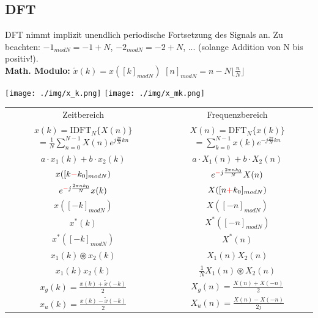 \documentclass[10pt,a4paper]{article}
\begin{document}
\begin{minipage}{0.5\textwidth}  
\subsection{DFT}
DFT nimmt implizit unendlich periodische Fortsetzung des Signals an. Zu beachten: $-1_{modN}=-1 + N$, $-2_{modN}=-2+N$, ... (solange Addition von N bis positiv!).\\
\textbf{Math. Modulo:}
$\tilde{x}(k) = x([k]_{modN})$ 
$[n]_{modN}=n-N \lfloor \frac{n}{N} \rfloor$
  \begin{center}
      \texttt{[image: ./img/x\_k.png]}
      \texttt{[image: ./img/x\_mk.png]}
  \end{center}

\begin{center}
  \bgroup
  \def\arraystretch{1.5}
  \begin{tabular}{ | c | c | }
  \cline{1-2}
          \rowcolor{black!15}
          Zeitbereich & Frequenzbereich \\
  
  \cline{1-2}
          \shortstack{$x(k)=\text{IDFT}_N\{X(n)\}$ \\ $=\frac{1}{N}\displaystyle\sum\limits_{n=0}^{N-1}X(n)e^{j\frac{2\pi}{N}kn}$} &
          \shortstack{$X(n)=\text{DFT}_N\{x(k)\}$ \\ $=\displaystyle\sum\limits_{k=0}^{N-1}x(k)e^{-j\frac{2\pi}{N}kn}$} \\

  \cline{1-2}
          $a\cdot x_1(k)+ b\cdot x_2(k)$ & $a\cdot X_1(n) +b\cdot X_2(n)$ \\
  \cline{1-2}
          $x([k\textcolor{red}{-}k_0]_{modN})$ & $e^{\textcolor{red}{-}j\frac{2\pi nk_0}{N}} X(n)$\\
  \cline{1-2}
          $e^{\textcolor{red}{-}j\frac{2\pi nk_0}{N}} x(k)$ & $X([n\textcolor{red}{+}k_0]_{modN})$ \\  
  \cline{1-2}
          $x([-k]_{modN})$ & $X([-n]_{modN})$ \\  
  \cline{1-2}
          $x^*(k)$& $X^*([-n]_{modN})$\\ 
  \cline{1-2}
          $x^*([-k]_{modN})$& $X^*(n)$\\ 
  \cline{1-2}
          $x_1(k) \circledast x_2(k)$ & $X_1(n)X_2(n)$ \\  
  \cline{1-2}
          $x_1(k)x_2(k)$ & $\frac{1}{N} X_1(n) \circledast X_2(n)$ \\
  \cline{1-2}
          $x_g(k)=\frac{x(k)+\tilde{x}(-k)}{2}$ & $X_g(n)=\frac{X(n)+X(-n)}{2}$ \\
  \cline{1-2}
          $x_u(k)=\frac{x(k)-\tilde{x}(-k)}{2}$ & $X_u(n)=\frac{X(n)-X(-n)}{2j}$ \\
  \cline{1-2}
  \end{tabular}
  \egroup
\end{center}
\end{minipage}
\end{document}
